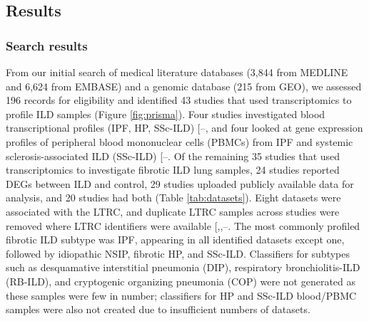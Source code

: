 \documentclass[
]{article}
\begin{document}
\subsection{Results}\label{results}

\subsubsection{Search results}\label{search-results}

From our initial search of medical literature databases (3,844 from MEDLINE and 6,624 from EMBASE) and a genomic database (215 from GEO), we assessed 196 records for eligibility and identified 43 studies that used transcriptomics to profile ILD samples (Figure \ref{fig:prisma}). Four studies investigated blood transcriptional profiles (IPF, HP, SSc-ILD) {[}--\citeproc{ref-jia_interleukin_2023}{57}{]}, and four looked at gene expression profiles of peripheral blood mononuclear cells (PBMCs) from IPF and systemic sclerosis-associated ILD (SSc-ILD) {[}--\citeproc{ref-assassi_peripheral_2022}{61}{]}. Of the remaining 35 studies that used transcriptomics to investigate fibrotic ILD lung samples, 24 studies reported DEGs between ILD and control, 29 studies uploaded publicly available data for analysis, and 20 studies had both (Table \ref{tab:datasets}). Eight datasets were associated with the LTRC, and duplicate LTRC samples across studies were removed where LTRC identifiers were available {[},,--\citeproc{ref-borie_colocalization_2022}{69}{]}. The most commonly profiled fibrotic ILD subtype was IPF, appearing in all identified datasets except one, followed by idiopathic NSIP, fibrotic HP, and SSc-ILD. Classifiers for subtypes such as desquamative interstitial pneumonia (DIP), respiratory bronchiolitis-ILD (RB-ILD), and cryptogenic organizing pneumonia (COP) were not generated as these samples were few in number; classifiers for HP and SSc-ILD blood/PBMC samples were also not created due to insufficient numbers of datasets.

\captionsetup{width=6.5in}
\end{document}
